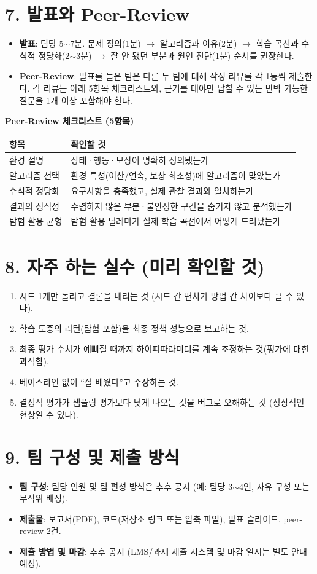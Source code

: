 \documentclass[12pt]{article}
\begin{document}
\newpage
\section*{7. 발표와 Peer-Review}
\begin{itemize}
\item \textbf{발표}: 팀당 5$\sim$7분. 문제 정의(1분) $\to$ 알고리즘과
  이유(2분) $\to$ 학습 곡선과 수식적 정당화(2$\sim$3분) $\to$ 잘 안 됐던
  부분과 원인 진단(1분) 순서를 권장한다.
\item \textbf{Peer-Review}: 발표를 들은 팀은 다른 두 팀에 대해 작성
  리뷰를 각 1통씩 제출한다. 각 리뷰는 아래 5항목 체크리스트와, 근거를
  대야만 답할 수 있는 반박 가능한 질문을 1개 이상 포함해야 한다.
\end{itemize}

\vspace{4pt}
\noindent\textbf{Peer-Review 체크리스트 (5항목)}
\begin{center}
\small
\begin{tabular}{@{}ll@{}}
\toprule
항목 & 확인할 것 \\
\midrule
환경 설명 & 상태·행동·보상이 명확히 정의됐는가 \\
알고리즘 선택 & 환경 특성(이산/연속, 보상 희소성)에 알고리즘이 맞았는가 \\
수식적 정당화 & 요구사항을 충족했고, 실제 관찰 결과와 일치하는가 \\
결과의 정직성 & 수렴하지 않은 부분·불안정한 구간을 숨기지 않고
분석했는가 \\
탐험-활용 균형 & 탐험-활용 딜레마가 실제 학습 곡선에서 어떻게
드러났는가 \\
\bottomrule
\end{tabular}
\end{center}

\section*{8. 자주 하는 실수 (미리 확인할 것)}
\begin{enumerate}
\item 시드 1개만 돌리고 결론을 내리는 것 (시드 간 편차가 방법 간
  차이보다 클 수 있다).
\item 학습 도중의 리턴(탐험 포함)을 최종 정책 성능으로 보고하는 것.
\item 최종 평가 수치가 예뻐질 때까지 하이퍼파라미터를 계속 조정하는
  것(평가에 대한 과적합).
\item 베이스라인 없이 ``잘 배웠다''고 주장하는 것.
\item 결정적 평가가 샘플링 평가보다 낮게 나오는 것을 버그로 오해하는
  것 (정상적인 현상일 수 있다).
\end{enumerate}

\section*{9. 팀 구성 및 제출 방식}
\begin{itemize}
\item \textbf{팀 구성}: 팀당 인원 및 팀 편성 방식은 추후 공지 (예:
  팀당 3$\sim$4인, 자유 구성 또는 무작위 배정).
\item \textbf{제출물}: 보고서(PDF), 코드(저장소 링크 또는 압축 파일),
  발표 슬라이드, peer-review 2건.
\item \textbf{제출 방법 및 마감}: 추후 공지 (LMS/과제 제출 시스템 및
  마감 일시는 별도 안내 예정).
\end{itemize}
\end{document}
